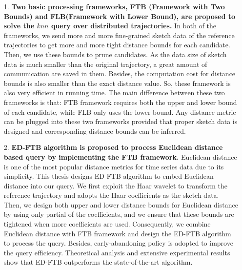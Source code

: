 \begin{itemize}
\item[1.] \textbf{Two basic processing frameworks, FTB (Framework with Two Bounds) and FLB(Framework with Lower Bound), are proposed to solve the $knn$ query over distributed trajectories.} In both of the frameworks, we  send  more and more fine-grained sketch data of the reference trajectories to get more and more tight distance bounds for each candidate. Then, we use these bounds to prune candidates. 
As the data size of sketch data is much smaller than the original trajectory, a great amount of communication are saved in them. Besides, the computation cost for distance bounds is also smaller than the exact distance value. So, these framework is also very efficient in running time. 
The main difference between these two frameworks is that: FTB framework  requires both the upper and lower bound of each candidate, while FLB only uses the lower bound. Any distance metric can be plugged into  these two frameworks provided that proper sketch data is designed and corresponding distance bounds can be inferred.

\item[2.] \textbf{ ED-FTB algorithm is proposed to process  Euclidean distance based query by implementing the FTB framework.} 
Euclidean distance is one of the most popular distance metrics for time series data due to its simplicity. This thesis designs ED-FTB algorithm to embed Euclidean distance into our query.
We first exploit the Haar wavelet to transform the reference trajectory and adopts the Haar coefficients as the sketch data. Then, we design both upper and lower distance  bounds for Euclidean distance by using only partial of the coefficients, and we ensure that these bounds are tightened when more coefficients are used.
Consequently, we combine Euclidean distance with FTB framework and design the  ED-FTB algorithm to process the query. Besides, early-abandoning policy is adopted to improve the query efficiency. Theoretical analysis and extensive experimental results  show that ED-FTB outperforms the state-of-the-art algorithm.


\end{itemize}
